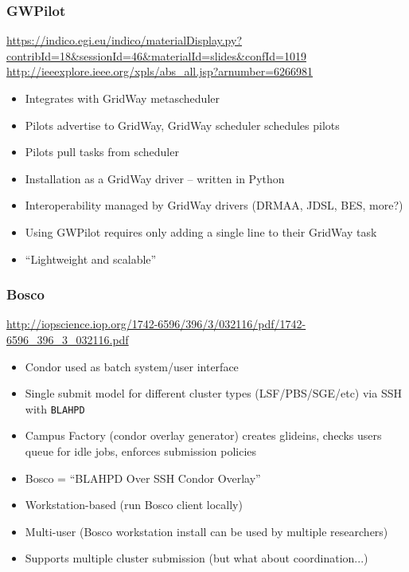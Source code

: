 \documentclass{sig-alternate}
\begin{document}
\subsubsection{GWPilot}
\url{https://indico.egi.eu/indico/materialDisplay.py?contribId=18&sessionId=46&materialId=slides&confId=1019}
\\
\url{http://ieeexplore.ieee.org/xpls/abs_all.jsp?arnumber=6266981}
\begin{itemize}
\item Integrates with GridWay metascheduler
\item Pilots advertise to GridWay, GridWay scheduler schedules pilots
\item Pilots pull tasks from scheduler
\item Installation as a GridWay driver -- written in Python
\item Interoperability managed by GridWay drivers (DRMAA, JDSL, BES, more?)
\item Using GWPilot requires only adding a single line to their GridWay task
\item ``Lightweight and scalable''
\end{itemize}

\subsubsection{Bosco}
\url{http://iopscience.iop.org/1742-6596/396/3/032116/pdf/1742-6596_396_3_032116.pdf}
\\
\begin{itemize}
\item Condor used as batch system/user interface
\item Single submit model for different cluster types (LSF/PBS/SGE/etc) via SSH with \texttt{BLAHPD}
\item Campus Factory (condor overlay generator) creates glideins, checks users queue for idle jobs, 
  enforces submission policies
\item Bosco = ``BLAHPD Over SSH Condor Overlay''
\item Workstation-based (run Bosco client locally)
\item Multi-user (Bosco workstation install can be used by multiple researchers)
\item Supports multiple cluster submission (but what about coordination...)

\end{itemize}
% 
\end{document}
